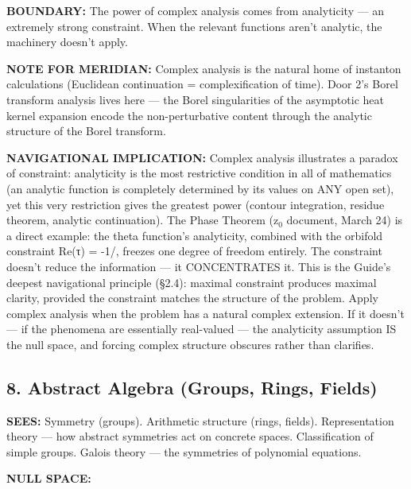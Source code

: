 \textbf{BOUNDARY:} The power of complex analysis comes from analyticity — an extremely strong constraint. When the relevant functions aren't analytic, the machinery doesn't apply.


\textbf{NOTE FOR MERIDIAN:} Complex analysis is the natural home of instanton calculations (Euclidean continuation = complexification of time). Door 2's Borel transform analysis lives here — the Borel singularities of the asymptotic heat kernel expansion encode the non-perturbative content through the analytic structure of the Borel transform.


\textbf{NAVIGATIONAL IMPLICATION:} Complex analysis illustrates a paradox of constraint: analyticity is the most restrictive condition in all of mathematics (an analytic function is completely determined by its values on ANY open set), yet this very restriction gives the greatest power (contour integration, residue theorem, analytic continuation). The Phase Theorem (z$_0$ document, March 24) is a direct example: the theta function's analyticity, combined with the orbifold constraint Re(τ) = -1/, freezes one degree of freedom entirely. The constraint doesn't reduce the information — it CONCENTRATES it. This is the Guide's deepest navigational principle (§2.4): maximal constraint produces maximal clarity, provided the constraint matches the structure of the problem. Apply complex analysis when the problem has a natural complex extension. If it doesn't — if the phenomena are essentially real-valued — the analyticity assumption IS the null space, and forcing complex structure obscures rather than clarifies.


\bigskip\noindent\makebox[\textwidth]{\color{rulegray}\rule{5cm}{0.3pt}}\bigskip


\subsection*{8. Abstract Algebra (Groups, Rings, Fields)}


\textbf{SEES:} Symmetry (groups). Arithmetic structure (rings, fields). Representation theory — how abstract symmetries act on concrete spaces. Classification of simple groups. Galois theory — the symmetries of polynomial equations.


\textbf{NULL SPACE:}

